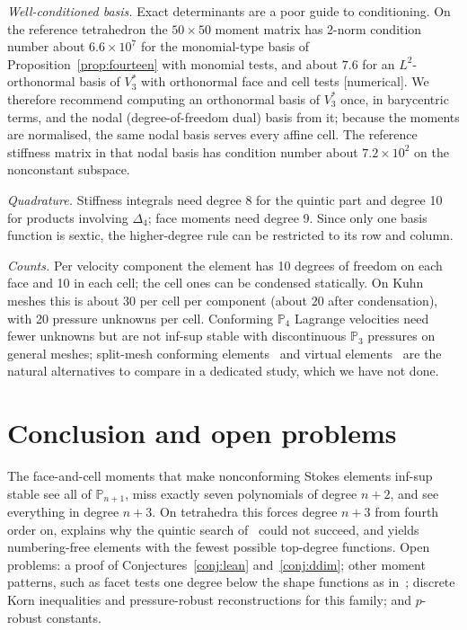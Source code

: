 \documentclass[11pt,a4paper]{article}
\theoremstyle{definition}
\theoremstyle{remark}
\newcommand{\evid}[1]{\textsf{[#1]}}
\newcommand{\Pol}{\mathbb P}
\begin{document}
\emph{Well-conditioned basis.} Exact determinants are a poor guide to
conditioning. On the reference tetrahedron the \(50\times50\) moment matrix
has 2-norm condition number about \(6.6\times10^7\) for the monomial-type basis
of Proposition~\ref{prop:fourteen} with monomial tests, and about \(7.6\) for an
\(L^2\)-orthonormal basis of \(V_3^*\) with orthonormal face and cell tests
\evid{numerical}. We therefore recommend computing an orthonormal basis of
\(V_3^*\) once, in barycentric terms, and the nodal (degree-of-freedom dual)
basis from it; because the moments are normalised, the same nodal basis
serves every affine cell. The reference stiffness matrix in that nodal basis
has condition number about \(7.2\times10^2\) on the nonconstant subspace.

\emph{Quadrature.} Stiffness integrals need degree 8 for the quintic part and
degree 10 for products involving \(\Delta_4\); face moments need degree 9. Since
only one basis function is sextic, the higher-degree rule can be restricted to
its row and column.

\emph{Counts.} Per velocity component the element has 10 degrees of freedom on
each face and 10 in each cell; the cell ones can be condensed statically. On
Kuhn meshes this is about 30 per cell per component (about 20 after
condensation), with 20 pressure unknowns per cell. Conforming \(\Pol_4\)
Lagrange velocities need fewer unknowns but are not inf-sup stable with
discontinuous \(\Pol_3\) pressures on general meshes; split-mesh conforming
elements~\cite{SV1985,GN2014a} and virtual elements~\cite{CGM2016} are the
natural alternatives to compare in a dedicated study, which we have not done.

\section{Conclusion and open problems}

The face-and-cell moments that make nonconforming Stokes elements inf-sup stable
see all of \(\Pol_{n+1}\), miss exactly seven polynomials of degree \(n+2\), and
see everything in degree \(n+3\). On tetrahedra this forces degree \(n+3\) from
fourth order on, explains why the quintic search of~\cite{BAJO2025} could not
succeed, and yields numbering-free elements with the fewest possible top-degree
functions. Open problems: a proof of Conjectures~\ref{conj:lean}
and~\ref{conj:ddim}; other moment patterns, such as facet tests one degree below
the shape functions as in~\cite{BCS2026}; discrete Korn inequalities and
pressure-robust reconstructions for this family; and \(p\)-robust constants.
\end{document}
